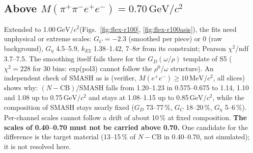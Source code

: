 \documentclass[11pt,a4paper]{article}
\newcommand{\Mfour}{\ensuremath{M(\pi^{+}\pi^{-}e^{+}e^{-})}\xspace}
\newcommand{\Mee}{\ensuremath{M(e^{+}e^{-})}\xspace}
\newcommand{\GeVcc}{\ensuremath{\mathrm{GeV}/c^{2}}\xspace}
\newcommand{\MeVcc}{\ensuremath{\mathrm{MeV}/c^{2}}\xspace}
\newcommand{\kEtwo}{\ensuremath{k_{E2}}\xspace}
\newcommand{\Geta}{\ensuremath{G_\eta}\xspace}
\begin{document}
\subsection{Above \texorpdfstring{\Mfour$=0.70$\,\GeVcc}{M4 = 0.70 GeV/c2}}
\label{sec:flex-r100}
Extended to 1.00\,\GeVcc (Figs.~\ref{fig:flex-r100}, \ref{fig:flex-r100asis}), the fits need unphysical or extreme scales: $G_C=-2.3$ (smoothed per piece) or 0 (raw
background), \Geta 4.5--5.9, \kEtwo 1.38--1.42, 7--8$\sigma$ from its constraint; Pearson $\chi^2$/ndf 3.7--7.5. The smoothing itself fails there
for the $G_D(\omega/\rho)$ template of S5 ($\chi^2=228$ for 30 bins: exp(pol3) cannot follow the $\rho^0$/$\omega$ structure). An independent check
of SMASH as is (verifier, \Mee$\ge10$\,\MeVcc, all slices) shows why: $(N-\mathrm{CB})$/SMASH falls from 1.20--1.23 in 0.575--0.675 to 1.14, 1.10 and
1.08 up to 0.75\,\GeVcc and stays at 1.08--1.15 up to 0.85\,\GeVcc, while the composition of SMASH stays nearly fixed ($G_D$ 73--77\,\%, $G_C$
18--20\,\%, \Geta 5--6\,\%). Per-channel scales cannot follow a drift of about 10\,\% at fixed composition. \textbf{The scales of 0.40--0.70 must not
be carried above 0.70.} One candidate for the difference is the target material (13--15\,\% of $N-\mathrm{CB}$ in 0.40--0.70, not simulated); it is
not resolved here.
\end{document}
